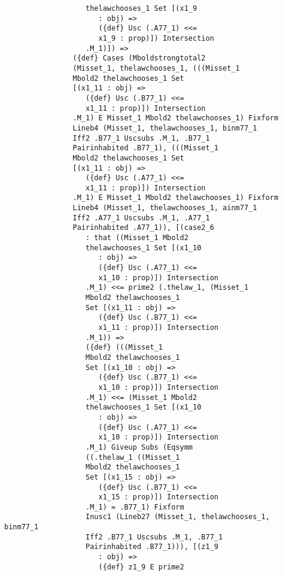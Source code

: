 \documentclass[12pt]{article}
\begin{document}
\begin{verbatim}
                   thelawchooses_1 Set [(x1_9 
                      : obj) => 
                      ({def} Usc (.A77_1) <<= 
                      x1_9 : prop)]) Intersection 
                   .M_1)]) => 
                ({def} Cases (Mboldstrongtotal2 
                (Misset_1, thelawchooses_1, (((Misset_1 
                Mbold2 thelawchooses_1 Set 
                [(x1_11 : obj) => 
                   ({def} Usc (.B77_1) <<= 
                   x1_11 : prop)]) Intersection 
                .M_1) E Misset_1 Mbold2 thelawchooses_1) Fixform 
                Lineb4 (Misset_1, thelawchooses_1, binm77_1 
                Iff2 .B77_1 Uscsubs .M_1, .B77_1 
                Pairinhabited .B77_1), (((Misset_1 
                Mbold2 thelawchooses_1 Set 
                [(x1_11 : obj) => 
                   ({def} Usc (.A77_1) <<= 
                   x1_11 : prop)]) Intersection 
                .M_1) E Misset_1 Mbold2 thelawchooses_1) Fixform 
                Lineb4 (Misset_1, thelawchooses_1, ainm77_1 
                Iff2 .A77_1 Uscsubs .M_1, .A77_1 
                Pairinhabited .A77_1)), [(case2_6 
                   : that ((Misset_1 Mbold2 
                   thelawchooses_1 Set [(x1_10 
                      : obj) => 
                      ({def} Usc (.A77_1) <<= 
                      x1_10 : prop)]) Intersection 
                   .M_1) <<= prime2 (.thelaw_1, (Misset_1 
                   Mbold2 thelawchooses_1 
                   Set [(x1_11 : obj) => 
                      ({def} Usc (.B77_1) <<= 
                      x1_11 : prop)]) Intersection 
                   .M_1)) => 
                   ({def} (((Misset_1 
                   Mbold2 thelawchooses_1 
                   Set [(x1_10 : obj) => 
                      ({def} Usc (.B77_1) <<= 
                      x1_10 : prop)]) Intersection 
                   .M_1) <<= (Misset_1 Mbold2 
                   thelawchooses_1 Set [(x1_10 
                      : obj) => 
                      ({def} Usc (.A77_1) <<= 
                      x1_10 : prop)]) Intersection 
                   .M_1) Giveup Subs (Eqsymm 
                   ((.thelaw_1 ((Misset_1 
                   Mbold2 thelawchooses_1 
                   Set [(x1_15 : obj) => 
                      ({def} Usc (.B77_1) <<= 
                      x1_15 : prop)]) Intersection 
                   .M_1) = .B77_1) Fixform 
                   Inusc1 (Lineb27 (Misset_1, thelawchooses_1, binm77_1 
                   Iff2 .B77_1 Uscsubs .M_1, .B77_1 
                   Pairinhabited .B77_1))), [(z1_9 
                      : obj) => 
                      ({def} z1_9 E prime2 

\end{verbatim}
\end{document}
